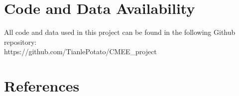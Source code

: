 \documentclass[11pt, letterpaper]{article} %
\begin{document}
\section*{Code and Data Availability}
All code and data used in this project can be found in the following Github repository: \\ https://github.com/TianlePotato/CMEE\_project


\newpage
\section*{References}

    \nocite{brown_accelerometer_finescale_2013}
    \nocite{c_elegans_2013}

\begingroup
\renewcommand{\section}[2]{}%

\endgroup
\end{document}
